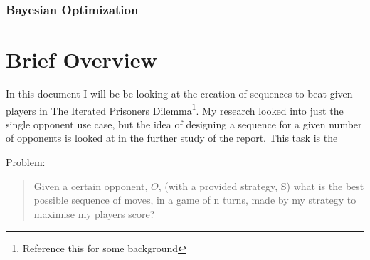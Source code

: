 \subsubsection{Bayesian Optimization}

\section{Brief Overview}\label{sec:briefOverview}
In this document I will be be looking at the creation of sequences to beat given players in The Iterated Prisoners Dilemma\footnote{Reference this for some background}.
My research looked into just the single opponent use case, but the idea of designing a sequence for a given number of opponents is looked at in the further study of the report.
This task is the


Problem:\\
\begin{quotation}
    Given a certain opponent, \(O\), (with a provided strategy, S) what is the best possible sequence of moves, in a game of n turns, made by my strategy to maximise my players score?
\end{quotation}

